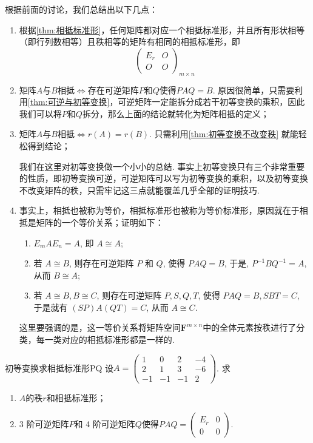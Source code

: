 根据前面的讨论，我们总结出以下几点：
\begin{enumerate}
    \item 根据\autoref{thm:相抵标准形}，任何矩阵都对应一个相抵标准形，并且所有形状相等（即行列数相等）且秩相等的矩阵有相同的相抵标准形，即\[\begin{pmatrix}
                  E_r & O \\ O & O
              \end{pmatrix}_{m\times n}\]

    \item 矩阵$A$与$B$相抵$\iff$存在可逆矩阵$P$和$Q$使得$PAQ=B$. 原因很简单，只需要利用\autoref{thm:可逆与初等变换}，可逆矩阵一定能拆分成若干初等变换的乘积，因此我们可以将$P$和$Q$拆分，那么上面的结论就转化为矩阵相抵的定义；

    \item 矩阵$A$与$B$相抵$\iff r(A)=r(B)$. 只需利用\autoref{thm:初等变换不改变秩} 就能轻松得到结论；

          我们在这里对初等变换做一个小小的总结. 事实上初等变换只有三个非常重要的性质，即初等变换可逆，可逆矩阵可以写为初等变换的乘积，以及初等变换不改变矩阵的秩，只需牢记这三点就能覆盖几乎全部的证明技巧.

    \item 事实上，相抵也被称为等价，相抵标准形也被称为等价标准形，原因就在于相抵是矩阵的一个等价关系；证明如下：
          \begin{enumerate}
              \item $E_m A E_n = A$, 即 $A \cong A$;

              \item 若 $A \cong B$, 则存在可逆矩阵 $P$ 和 $Q$, 使得 $PAQ = B$, 于是, $P^{-1} B Q^{-1} = A$, 从而 $B \cong A$;

              \item 若 $A \cong B, B \cong C$, 则存在可逆矩阵 $P, S, Q, T$, 使得 $PAQ = B, SBT = C$, 于是就有 $(SP)A(QT) = C$, 从而 $A \cong C$.
          \end{enumerate}

          这里要强调的是，这一等价关系将矩阵空间$\mathbf{F}^{m\times n}$中的全体元素按秩进行了分类，每一类对应的相抵标准形都是一样的.
\end{enumerate}

\begin{example}{}{初等变换求相抵标准形PQ}
    设$A=\begin{pmatrix}
            1 & 0 & 2 & -4 \\ 2 & 1 & 3 & -6 \\ -1 & -1 & -1 & 2
        \end{pmatrix}$. 求
    \begin{enumerate}[label=(\arabic*)]
        \item $A$的秩$r$和相抵标准形；

        \item
              3 阶可逆矩阵$P$和 4 阶可逆矩阵$Q$使得$PAQ=\begin{pmatrix}
                      E_r & 0 \\ 0 & 0
                  \end{pmatrix}$.
    \end{enumerate}
\end{example}

